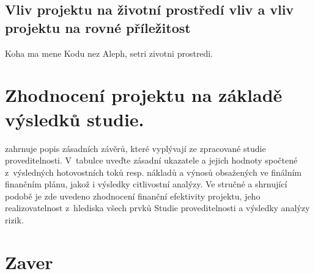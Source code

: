 \documentclass[
	12pt, oneside, printed, final, 
	table,   %
	lof,     %
	lot     %
]{fithesis3}
\begin{document}
{\section{ Vliv projektu na životní prostředí vliv a vliv projektu na rovné příležitost}

Koha ma mene Kodu nez Aleph, setri zivotni prostredi.

\chapter{Zhodnocení projektu na základě výsledků studie.}

 zahrnuje popis zásadních závěrů, které vyplývají ze zpracované studie
proveditelnosti. V~tabulce uveďte zásadní ukazatele a jejich hodnoty spočtené
z~výsledných hotovostních toků resp. nákladů a výnosů obsažených ve finálním
finančním plánu, jakož i výsledky citlivostní analýzy. Ve stručné a shrnující podobě je
zde uvedeno zhodnocení finanční efektivity projektu, jeho realizovatelnost z~hlediska
všech prvků Studie proveditelnosti a výsledky analýzy rizik. 

\chapter{Zaver}


\makeatletter\thesis@blocks@clear\makeatother
{} %


\makeatletter\thesis@blocks@clear\makeatother
\renewcommand{\theHchapter}{A\arabic{chapter}}
\appendix %


\printbibliography[title={Seznam literatury},heading=bibintoc]


}
\end{document}
